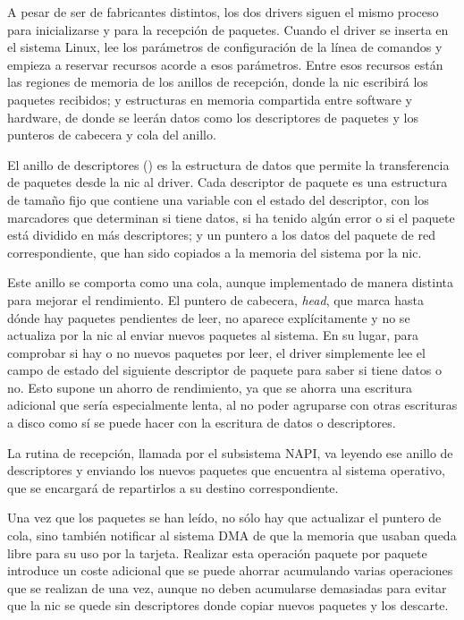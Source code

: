 \documentclass[twoside, 12pt]{epstfg}
\begin{document}
A pesar de ser de fabricantes distintos, los dos \glspl{driver} siguen el mismo proceso para inicializarse y para la recepción de paquetes. Cuando el \gls{driver} se inserta en el sistema Linux, lee los parámetros de configuración de la línea de comandos y empieza a reservar recursos acorde a esos parámetros. Entre esos recursos están las regiones de memoria de los anillos de recepción, donde la \gls{nic} escribirá los paquetes recibidos; y estructuras en memoria compartida entre software y hardware, de donde se leerán datos como los descriptores de paquetes y los punteros de cabecera y cola del anillo.

El anillo de descriptores () es la estructura de datos que permite la transferencia de paquetes desde la \gls{nic} al \gls{driver}. Cada descriptor de paquete es una estructura de tamaño fijo que contiene una variable con el estado del descriptor, con los marcadores que determinan si tiene datos, si ha tenido algún error o si el paquete está dividido en más descriptores; y un puntero a los datos del paquete de red correspondiente, que han sido copiados a la memoria del sistema por la \gls{nic}.

Este anillo se comporta como una cola, aunque implementado de manera distinta para mejorar el rendimiento. El puntero de cabecera, \textit{head}, que marca hasta dónde hay paquetes pendientes de leer, no aparece explícitamente y no se actualiza por la \gls{nic} al enviar nuevos paquetes al sistema. En su lugar, para comprobar si hay o no nuevos paquetes por leer, el \gls{driver} simplemente lee el campo de estado del siguiente descriptor de paquete para saber si tiene datos o no. Esto supone un ahorro de rendimiento, ya que se ahorra una escritura adicional que sería especialmente lenta, al no poder agruparse con otras escrituras a disco como sí se puede hacer con la escritura de datos o descriptores.

La rutina de recepción, llamada por el subsistema \gls{NAPI}, va leyendo ese anillo de descriptores y enviando los nuevos paquetes que encuentra al sistema operativo, que se encargará de repartirlos a su destino correspondiente.

Una vez que los paquetes se han leído, no sólo hay que actualizar el puntero de cola, sino también notificar al sistema \gls{DMA} de que la memoria que usaban queda libre para su uso por la tarjeta. Realizar esta operación paquete por paquete introduce un coste adicional que se puede ahorrar acumulando varias operaciones que se realizan de una vez, aunque no deben acumularse demasiadas para evitar que la \gls{nic} se quede sin descriptores donde copiar nuevos paquetes y los descarte.
\end{document}
